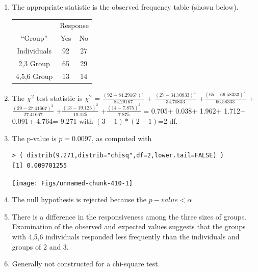 \documentclass[10pt,openany]{book}\usepackage[]{graphicx}\usepackage[]{color}
\makeatletter
\newenvironment{kframe}{%
 \def\at@end@of@kframe{}%
 \ifinner\ifhmode%
  \def\at@end@of@kframe{\end{minipage}}%
  \begin{minipage}{\columnwidth}%
 \fi\fi%
 \def\FrameCommand##1{\hskip\@totalleftmargin \hskip-\fboxsep
 \colorbox{shadecolor}{##1}\hskip-\fboxsep
     \hskip-\linewidth \hskip-\@totalleftmargin \hskip\columnwidth}%
 \MakeFramed {\advance\hsize-\width
   \@totalleftmargin\z@ \linewidth\hsize
   \@setminipage}}%
 {\par\unskip\endMakeFramed%
 \at@end@of@kframe}
\newenvironment{knitrout}{}{} %
\makeatother
\begin{document}
\begin{itemize}
\begin{enumerate}
      \item The appropriate statistic is the observed frequency table (shown below).
        \begin{center}
          \begin{tabular}{|c|c|c|}
            \multicolumn{1}{c}{} & \multicolumn{2}{c}{Response} \\
            \cline{2-3}
            \multicolumn{1}{c|}{``Group''} & Yes & No \\
            \hline
            Individuals & 92 & 27 \\
            \hline
            2,3 Group & 65 & 29 \\
            \hline
            4,5,6 Group & 13 & 14 \\
            \hline
          \end{tabular}
        \end{center}
      \item The $\chi^{2}$ test statistic is $\chi^{2}$ = $\frac{(92-84.29167)^{2}}{84.29167}$ + $\frac{(27-34.70833)^{2}}{34.70833}$ +$\frac{(65-66.58333)^{2}}{66.58333}$ +$\frac{(29-27.41667)^{2}}{27.41667}$ +$\frac{(13-19.125)^{2}}{19.125}$ +$\frac{(14-7.875)^{2}}{7.875}$ = 0.705+ 0.038+ 1.962+ 1.712+ 0.091+ 4.764= 9.271 with $(3-1)*(2-1)$=2 df.
      \item The p-value is $p=0.0097$, as computed with
\begin{knitrout}
\color{fgcolor}\begin{kframe}
\begin{verbatim}
> ( distrib(9.271,distrib="chisq",df=2,lower.tail=FALSE) )
[1] 0.009701255
\end{verbatim}
\end{kframe}

{\centering \texttt{[image: Figs/unnamed-chunk-410-1]} 

}



\end{knitrout}
      \item The null hypothesis is rejected because the $p-value<\alpha$.
      \item There is a difference in the responsiveness among the three sizes of groups.  Examination of the observed and expected values suggests that the groups with 4,5,6 individuals responded less frequently than the individuals and groups of 2 and 3.
      \item Generally not constructed for a chi-square test.
    \end{enumerate}


\end{itemize}
\end{document}
